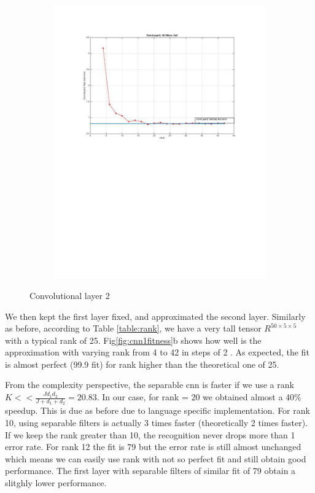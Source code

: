 \documentclass{article} %
\begin{document}
\begin{figure}[h]
\begin{subfigure}[b]{0.40\textwidth}
    \includegraphics[width=\textwidth]{images/imagesCNN_page1.pdf}
    \caption{}
  \end{subfigure}
  \caption{Convolutional layer 2}
  \label{fig:cnn1error}
\end{figure}

We then kept the first layer fixed, and approximated the second layer.
Similarly as before, according to Table \ref{table:rank}, we have a very tall tensor $R^{50\times 5 \times 5}$ with a typical rank of 25.
Fig\ref{fig:cnn1fitness}b shows how well is the approximation with varying rank from 4 to 42 in steps of 2 . As expected, the fit is almost perfect (99.9 fit) for rank higher than the theoretical one of 25.

From the complexity perspective, the separable cnn is faster if we use a rank $K << \frac{Jd_{1}d_{2}}{J +d_{1}+d_{2}} = 20.83$. In our case, for rank = 20 we obtained almost a 40$\%$ speedup. This is due as before due to language specific implementation.
For rank 10, using separable filters is actually 3 times faster (theoretically 2 times faster).
If we keep the rank greater than 10, the recognition never drops more than 1 error rate.
For rank 12 the fit is 79 but the error rate is still almost unchanged which means we can easily use rank with not so perfect fit and still obtain good performance. The first layer with separable filters of similar fit of 79 obtain a slitghly lower performance.
\end{document}
